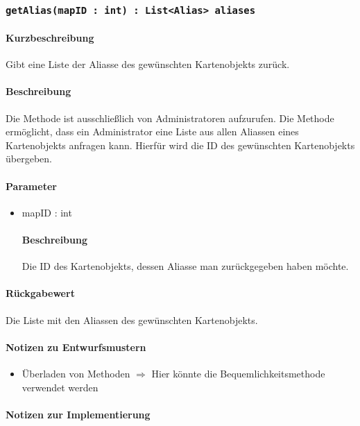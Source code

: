 \subsubsection{\texttt{getAlias(mapID : int) : List<Alias> aliases}}%
\paragraph*{Kurzbeschreibung}
Gibt eine Liste der Aliasse des gewünschten Kartenobjekts zurück.
\paragraph*{Beschreibung}
Die Methode ist ausschließlich von Administratoren aufzurufen.
Die Methode ermöglicht, dass ein Administrator eine Liste aus allen Aliassen eines Kartenobjekts anfragen kann.
Hierfür wird die ID des gewünschten Kartenobjekts übergeben.
\paragraph*{Parameter}
\begin{itemize}
    \item mapID : int
    		\paragraph*{Beschreibung}
    		Die ID des Kartenobjekts, dessen Aliasse man zurückgegeben haben möchte.
\end{itemize}
\paragraph*{Rückgabewert}
Die Liste mit den Aliassen des gewünschten Kartenobjekts.

\paragraph*{Notizen zu Entwurfsmustern}
\begin{itemize}
	\item Überladen von Methoden $\Rightarrow$ Hier könnte die Bequemlichkeitsmethode verwendet werden
\end{itemize}

\paragraph*{Notizen zur Implementierung}%
